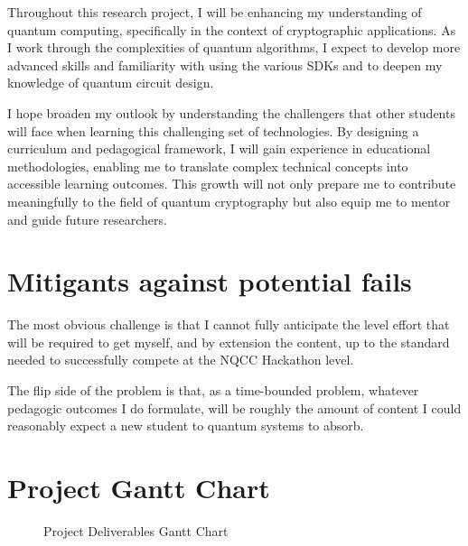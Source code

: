 \documentclass[11pt,a4paper]{article}
\begin{document}
Throughout this research project, I will be enhancing my understanding of quantum computing, specifically in the context of cryptographic applications. 
As I work through the complexities of quantum algorithms, I expect to develop more advanced skills and familiarity with using the various SDKs and to
deepen my knowledge of quantum circuit design. 

I hope broaden my outlook by understanding the challengers that other students will face when learning this challenging set of technologies.  
By designing a curriculum and pedagogical framework, I will gain experience in educational methodologies, enabling me to translate complex technical 
concepts into accessible learning outcomes. This growth will not only prepare me to contribute meaningfully to the field of quantum cryptography 
but also equip me to mentor and guide future researchers.

\section{Mitigants against potential fails}

The most obvious challenge is that I cannot fully anticipate the level effort that will be required to get myself, and by extension the content,
up to the standard needed to successfully compete at the NQCC Hackathon level.

The flip side of the problem is that, as a time-bounded problem, whatever pedagogic outcomes I do formulate, will be roughly the amount of content
I could reasonably expect a new student to quantum systems to absorb.

\pagebreak

\printbibliography

\pagebreak

\appendix

\section{Project Gantt Chart}

\begin{landscape}
\begin{figure}
  \hfill
  \caption{Project Deliverables Gantt Chart}
\end{figure}
\end{landscape}

\pagebreak

\printindex
\end{document}

